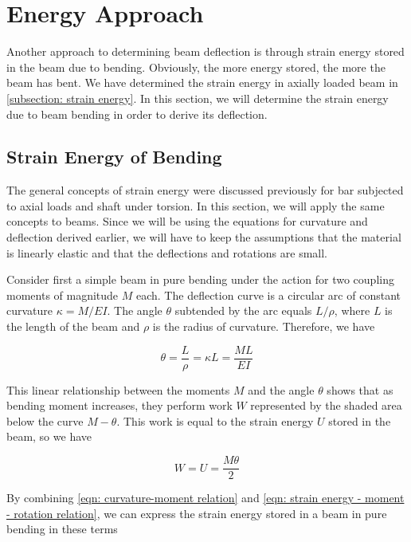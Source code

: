 \documentclass[
fontsize=10pt,
a4paper,
twosides=false,
open=any,
svgnames,
]{kaobook} %
\begin{document}
\section{Energy Approach}

Another approach to determining beam deflection is through strain energy stored in the beam due to bending. Obviously, the more energy stored, the more the beam has bent. We have determined the strain energy in axially loaded beam in \cref{subsection: strain energy}. In this section, we will determine the strain energy due to beam bending in order to derive its deflection.

\subsection{Strain Energy of Bending}

The general concepts of strain energy were discussed previously for bar subjected to axial loads and shaft under torsion. In this section, we will apply the same concepts to beams. Since we will be using the equations for curvature and deflection derived earlier, we will have to keep the assumptions that the material is linearly elastic and that the deflections and rotations are small.

Consider first a simple beam in pure bending under the action for two coupling moments of magnitude $M$ each. The deflection curve is a circular arc of constant curvature $\kappa = M/EI$. The angle $\theta$ subtended by the arc equals $L/\rho$, where $L$ is the length of the beam and $\rho$ is the radius of curvature. Therefore, we have

\begin{equation} \label{eqn: curvature-moment relation}
  \theta  = \frac{L}{\rho } = \kappa L = \frac{ML}{EI}
\end{equation}

This linear relationship between the moments $M$ and the angle $\theta$ shows that as bending moment increases, they perform work $W$ represented by the shaded area below the curve $M-\theta$. This work is equal to the strain energy $U$ stored in the beam, so we have

\begin{equation} \label{eqn: strain energy - moment - rotation relation}
  W = U = \frac{M\theta}{2}
\end{equation}

By combining \cref{eqn: curvature-moment relation} and \cref{eqn: strain energy - moment - rotation relation}, we can express the strain energy stored in a beam in pure bending in these terms
\end{document}
